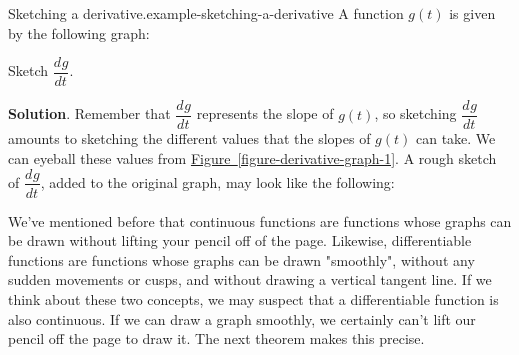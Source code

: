 \documentclass[10pt,]{book}
\numberwithin{equation}{section}
\newcommand{\dv}[3][]{\dfrac{d^{#1} #2}{d #3^{#1}}}
\begin{document}
\begin{example}{Sketching a derivative.}{example-sketching-a-derivative}%
\hypertarget{p-105}{}%
A function \(g(t)\) is given by the following graph: \begin{figure}
\centering
{
}
\end{figure}
%
\par
\hypertarget{p-106}{}%
Sketch \(\dv{g}{t}\).%
\par\smallskip%
\noindent\textbf{Solution}.\hypertarget{solution-23}{}\quad%
\hypertarget{p-107}{}%
Remember that \(\dv{g}{t}\) represents the slope of \(g(t)\), so sketching \(\dv{g}{t}\) amounts to sketching the different values that the slopes of \(g(t)\) can take. We can eyeball these values from \hyperref[figure-derivative-graph-1]{Figure~\ref{figure-derivative-graph-1}}. A rough sketch of \(\dv{g}{t}\), added to the original graph, may look like the following: \begin{figure}
\centering
{
}
\end{figure}
%
\end{example}
\hypertarget{p-108}{}%
We've mentioned before that continuous functions are functions whose graphs can be drawn without lifting your pencil off of the page. Likewise, differentiable functions are functions whose graphs can be drawn "smoothly", without any sudden movements or cusps, and without drawing a vertical tangent line. If we think about these two concepts, we may suspect that a differentiable function is also continuous. If we can draw a graph smoothly, we certainly can't lift our pencil off the page to draw it. The next theorem makes this precise.%
\end{document}

